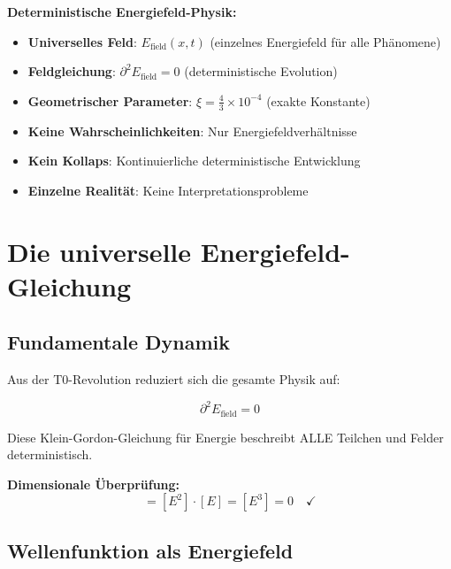 \documentclass[12pt,a4paper]{report}
\begin{document}
	\begin{tcolorbox}[colback=blue!5!white,colframe=blue!75!black,title=T0 Deterministische Grundlage]
		\textbf{Deterministische Energiefeld-Physik:}
		\begin{itemize}
			\item \textbf{Universelles Feld}: $E_{\text{field}}(x,t)$ (einzelnes Energiefeld für alle Phänomene)
			\item \textbf{Feldgleichung}: $\partial^2 E_{\text{field}} = 0$ (deterministische Evolution)
			\item \textbf{Geometrischer Parameter}: $\xi = \frac{4}{3} \times 10^{-4}$ (exakte Konstante)
			\item \textbf{Keine Wahrscheinlichkeiten}: Nur Energiefeldverhältnisse
			\item \textbf{Kein Kollaps}: Kontinuierliche deterministische Entwicklung
			\item \textbf{Einzelne Realität}: Keine Interpretationsprobleme
		\end{itemize}
	\end{tcolorbox}
	
	\section{Die universelle Energiefeld-Gleichung}
	\label{sec:universal_field_equation}
	
	\subsection{Fundamentale Dynamik}
	\label{subsec:fundamental_dynamics}
	
	Aus der T0-Revolution reduziert sich die gesamte Physik auf:
	
	\begin{equation}
		\boxed{\partial^2 E_{\text{field}} = 0}
		\label{eq:universal_field_equation}
	\end{equation}
	
	Diese Klein-Gordon-Gleichung für Energie beschreibt ALLE Teilchen und Felder deterministisch.
	
	\textbf{Dimensionale Überprüfung:}
	\begin{equation}
		[\partial^2 E_{\text{field}}] = [E^2] \cdot [E] = [E^3] = 0 \quad \checkmark
	\end{equation}
	
	\subsection{Wellenfunktion als Energiefeld}
	\label{subsec:wave_function_energy_field}
	
\end{document}
